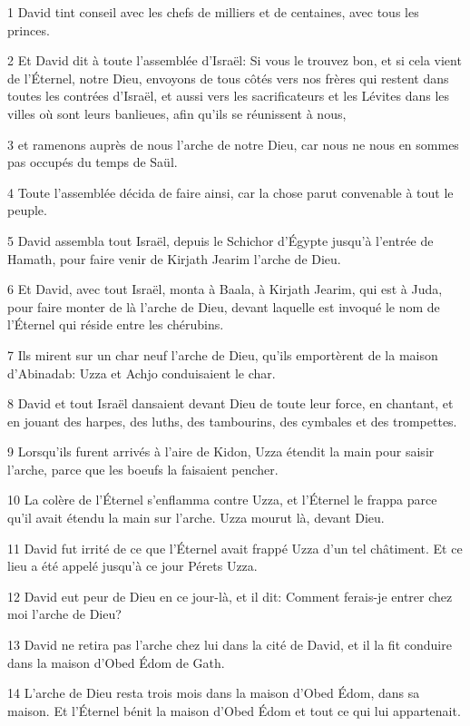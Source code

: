 \par 1 David tint conseil avec les chefs de milliers et de centaines, avec tous les princes.
\par 2 Et David dit à toute l'assemblée d'Israël: Si vous le trouvez bon, et si cela vient de l'Éternel, notre Dieu, envoyons de tous côtés vers nos frères qui restent dans toutes les contrées d'Israël, et aussi vers les sacrificateurs et les Lévites dans les villes où sont leurs banlieues, afin qu'ils se réunissent à nous,
\par 3 et ramenons auprès de nous l'arche de notre Dieu, car nous ne nous en sommes pas occupés du temps de Saül.
\par 4 Toute l'assemblée décida de faire ainsi, car la chose parut convenable à tout le peuple.
\par 5 David assembla tout Israël, depuis le Schichor d'Égypte jusqu'à l'entrée de Hamath, pour faire venir de Kirjath Jearim l'arche de Dieu.
\par 6 Et David, avec tout Israël, monta à Baala, à Kirjath Jearim, qui est à Juda, pour faire monter de là l'arche de Dieu, devant laquelle est invoqué le nom de l'Éternel qui réside entre les chérubins.
\par 7 Ils mirent sur un char neuf l'arche de Dieu, qu'ils emportèrent de la maison d'Abinadab: Uzza et Achjo conduisaient le char.
\par 8 David et tout Israël dansaient devant Dieu de toute leur force, en chantant, et en jouant des harpes, des luths, des tambourins, des cymbales et des trompettes.
\par 9 Lorsqu'ils furent arrivés à l'aire de Kidon, Uzza étendit la main pour saisir l'arche, parce que les boeufs la faisaient pencher.
\par 10 La colère de l'Éternel s'enflamma contre Uzza, et l'Éternel le frappa parce qu'il avait étendu la main sur l'arche. Uzza mourut là, devant Dieu.
\par 11 David fut irrité de ce que l'Éternel avait frappé Uzza d'un tel châtiment. Et ce lieu a été appelé jusqu'à ce jour Pérets Uzza.
\par 12 David eut peur de Dieu en ce jour-là, et il dit: Comment ferais-je entrer chez moi l'arche de Dieu?
\par 13 David ne retira pas l'arche chez lui dans la cité de David, et il la fit conduire dans la maison d'Obed Édom de Gath.
\par 14 L'arche de Dieu resta trois mois dans la maison d'Obed Édom, dans sa maison. Et l'Éternel bénit la maison d'Obed Édom et tout ce qui lui appartenait.


